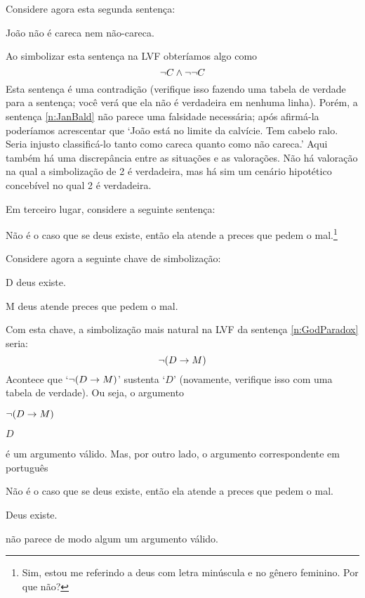 Considere agora esta segunda sentença:
	\begin{earg} \setcounter{eargnum}{1}
		\item\label{n:JanBald} João não é careca nem não-careca.
	\end{earg}
Ao simbolizar esta sentença na LVF obteríamos algo como
$$\neg C \wedge \neg \neg C$$
Esta sentença é uma contradição (verifique isso fazendo uma tabela de verdade para a sentença; você verá que ela não é verdadeira em nenhuma linha).
Porém, a sentença \ref{n:JanBald} não parece uma falsidade necessária; após afirmá-la poderíamos acrescentar que `João está no limite da calvície.
Tem cabelo ralo. Seria injusto classificá-lo tanto como careca quanto como não careca.'
Aqui também há uma discrepância entre as situações e as valorações.
Não há valoração na qual a simbolização de 2 é verdadeira, mas há sim um cenário hipotético concebível no qual 2 é verdadeira.

Em terceiro lugar, considere a seguinte sentença:
	\begin{earg}
\setcounter{eargnum}{2}	
		\item\label{n:GodParadox}	Não é o caso que se deus existe, então ela atende a preces que pedem o mal.\footnote{ Sim, estou me referindo a deus com letra minúscula e no gênero feminino. Por que não?}
	\end{earg}
Considere agora a seguinte chave de simbolização:
\begin{ekey}
	\item[D] deus existe.
	\item[M] deus atende preces que pedem o mal.
\end{ekey}
Com esta chave, a simbolização mais natural na LVF da sentença \ref{n:GodParadox} seria:
$$\neg (D \rightarrow M)$$
Acontece que `$\neg (D \rightarrow M)$' sustenta `$D$' (novamente, verifique isso com uma tabela de verdade).
Ou seja, o argumento
	\begin{earg}
		\item[] $\neg (D \rightarrow M)$
		\item[\therefore] $D$
	\end{earg}
é um argumento válido.
Mas, por outro lado, o argumento correspondente em português
	\begin{earg}
		\item[] Não é o caso que se deus existe, então ela atende a preces que pedem o mal.
		\item[\therefore] Deus existe.
	\end{earg}
não parece de modo algum um argumento válido.

